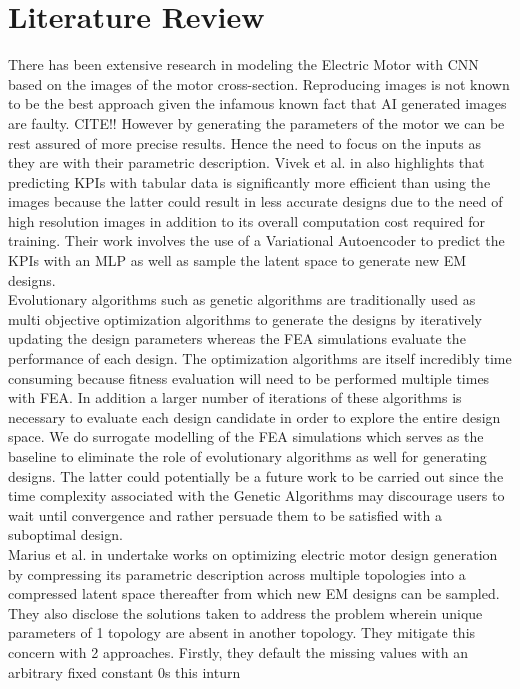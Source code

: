 \documentclass{report} %
\begin{document}
\chapter{Literature Review} 
There has been extensive research in modeling the Electric Motor with \ac{CNN} based on the images of the motor cross-section. 
Reproducing images is not known to be the best approach given the infamous known fact that AI generated images are faulty. CITE!!
However by generating the parameters of the motor we can be rest assured of more precise results. Hence the need to focus on the inputs as they are with their parametric description.
Vivek et al. in \cite{VAE-MT-2021} also highlights that predicting \ac{KPI}s with tabular data is significantly more efficient than using the images because the latter could result 
in less accurate designs due to the need of high resolution images in addition to its overall computation cost required for training. Their work 
involves the use of a Variational Autoencoder to predict the \ac{KPI}s with an \ac{MLP} as well as sample the latent space to generate new \ac{EM} designs.\\
Evolutionary algorithms such as genetic algorithms are traditionally used as multi objective optimization algorithms to generate the designs by iteratively
updating the design parameters whereas the \ac{FEA} simulations evaluate the performance of each design. 
The optimization algorithms are itself incredibly time consuming because fitness evaluation will need to be performed multiple times with \ac{FEA}.
In addition a larger number of iterations of these algorithms is necessary to evaluate each design candidate in order to explore the entire design space.
We do surrogate modelling of the \ac{FEA} simulations which serves as the baseline to eliminate the role of evolutionary algorithms as well for generating designs.
The latter could potentially be a future work to be carried out since the time complexity associated with the Genetic Algorithms 
may discourage users to wait until convergence and rather persuade them to be satisfied with a suboptimal design.\\
Marius et al. in \cite{VAE-MT-2021} undertake works on optimizing electric motor design generation by compressing its parametric description 
across multiple topologies into a compressed latent space thereafter from which new \ac{EM} designs can be sampled.
They also disclose the solutions taken to address the problem wherein unique parameters of 1 topology are absent in another topology.
They mitigate this concern with 2 approaches. Firstly, they default the missing values with an arbitrary fixed constant 0s this inturn 
\end{document}
